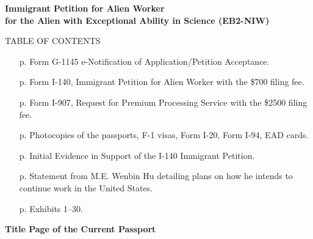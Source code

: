 \documentclass{article}
\begin{document}

\vspace*{\fill}
\begin{center}

{\bf 
Immigrant Petition for Alien Worker\\
for the Alien with Exceptional Ability in Science (EB2-NIW)
}

\end{center}
\vspace*{\fill}

\begin{center}
TABLE OF CONTENTS
\end{center}
\begin{itemize}
    \item [p. \pageref*{G-1145}] Form G-1145 e-Notification of Application/Petition Acceptance. 
    \item [p. \pageref*{I-140}] Form I-140, Immigrant Petition for Alien Worker with the \$700 filing fee.
    \item [p. \pageref*{I-907}] Form I-907, Request for Premium Processing Service with the \$2500 filing fee.
    \item [p. \pageref*{docs}] Photocopies of the passports, F-1 visas, Form I-20, Form I-94, EAD cards.
    \item [p. \pageref*{IE}] Initial Evidence in Support of the I-140 Immigrant Petition.
    \item [p. \pageref*{plans}] Statement from M.E. Wenbin Hu detailing plans on how he intends to continue work in the United States.
    \item [p. \pageref*{exhib}] Exhibits 1–30.
\end{itemize}

\clearpage
\label{G-1145}


\label{I-140}


\label{I-907}


\vspace*{\fill}
\begin{center}

{\LARGE \bf
Title Page of the Current Passport
}
\label{docs}
\end{center}
\vspace*{\fill}
\end{document}
